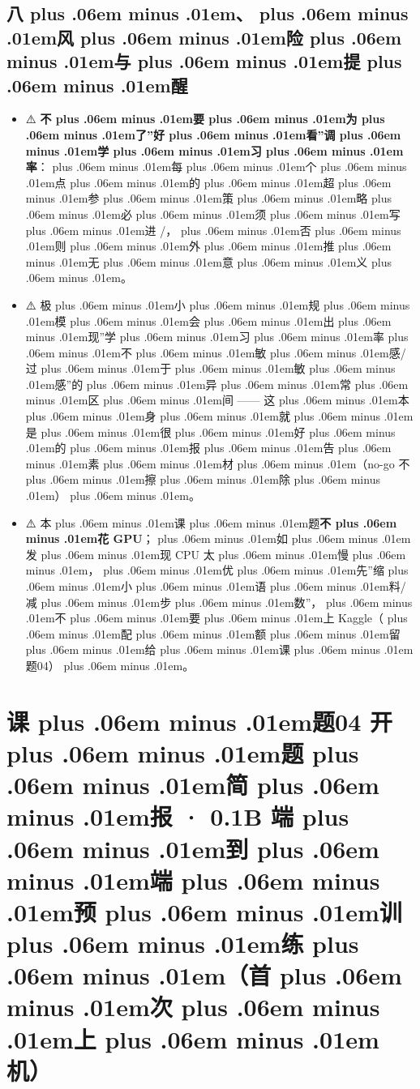 \documentclass[
]{article}
\newcommand{\passthrough}[1]{#1}
\providecommand{\tightlist}{%
  \setlength{\itemsep}{0pt}\setlength{\parskip}{0pt}}
\providecommand{\texorpdfstring}[2]{#1}   %
\def\zh#1{{\zhfont #1}}
\def\sym#1{{\symfont #1}}
\def\codezh#1{{\zhmonofont #1}}
\def\zhglue{\hskip0pt plus .06em minus .01em}
\begin{document}
\subsection{\zh{八\zhglue 、\zhglue 风\zhglue 险\zhglue 与\zhglue 提\zhglue 醒}}\label{ux516bux98ceux9669ux4e0eux63d0ux9192-1}

\begin{itemize}
\tightlist
\item
  \sym{⚠️} \textbf{\zh{不\zhglue 要\zhglue 为\zhglue 了}''\zh{好\zhglue 看}''\zh{调\zhglue 学\zhglue 习\zhglue 率}}\zh{：\zhglue 每\zhglue 个\zhglue 点\zhglue 的\zhglue 超\zhglue 参\zhglue 策\zhglue 略\zhglue 必\zhglue 须\zhglue 写\zhglue 进} \passthrough{\codezh{{\zh{证}}{\zh{据}}/}}\zh{，\zhglue 否\zhglue 则\zhglue 外\zhglue 推\zhglue 无\zhglue 意\zhglue 义\zhglue 。}
\item
  \sym{⚠️} \zh{极\zhglue 小\zhglue 规\zhglue 模\zhglue 会\zhglue 出\zhglue 现}''\zh{学\zhglue 习\zhglue 率\zhglue 不\zhglue 敏\zhglue 感}/\zh{过\zhglue 于\zhglue 敏\zhglue 感}''\zh{的\zhglue 异\zhglue 常\zhglue 区\zhglue 间} ------ \zh{这\zhglue 本\zhglue 身\zhglue 就\zhglue 是\zhglue 很\zhglue 好\zhglue 的\zhglue 报\zhglue 告\zhglue 素\zhglue 材\zhglue （}no-go \zh{不\zhglue 擦\zhglue 除\zhglue ）\zhglue 。}
\item
  \sym{⚠️} \zh{本\zhglue 课\zhglue 题}\textbf{\zh{不\zhglue 花} GPU}\zh{；\zhglue 如\zhglue 发\zhglue 现} CPU \zh{太\zhglue 慢\zhglue ，\zhglue 优\zhglue 先}''\zh{缩\zhglue 小\zhglue 语\zhglue 料}/\zh{减\zhglue 步\zhglue 数}''\zh{，\zhglue 不\zhglue 要\zhglue 上} Kaggle\zh{（\zhglue 配\zhglue 额\zhglue 留\zhglue 给\zhglue 课\zhglue 题}04\zh{）\zhglue 。}
\end{itemize}

\newpage

\section{\texorpdfstring{\zh{课\zhglue 题}04 \zh{开\zhglue 题\zhglue 简\zhglue 报} \sym{·} 0.1B \zh{端\zhglue 到\zhglue 端\zhglue 预\zhglue 训\zhglue 练\zhglue （}\textbf{\zh{首\zhglue 次\zhglue 上\zhglue 机}}\zh{）}}{\zh{课\zhglue 题}04 \zh{开\zhglue 题\zhglue 简\zhglue 报} \sym{·} 0.1B \zh{端\zhglue 到\zhglue 端\zhglue 预\zhglue 训\zhglue 练\zhglue （\zhglue 首\zhglue 次\zhglue 上\zhglue 机\zhglue ）}}}\label{ux8bfeux989804-ux5f00ux9898ux7b80ux62a5-0.1b-ux7aefux5230ux7aefux9884ux8badux7ec3ux9996ux6b21ux4e0aux673a}
\end{document}
